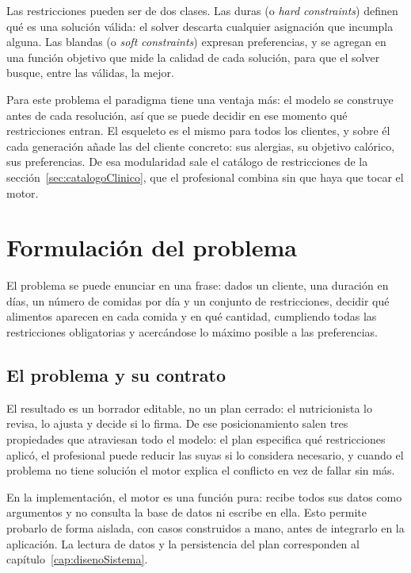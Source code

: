 Las restricciones pueden ser de dos clases. Las duras (o \textit{hard constraints}) definen qué es una solución válida: el solver descarta cualquier asignación que incumpla alguna. Las blandas (o \textit{soft constraints}) expresan preferencias, y se agregan en una función objetivo que mide la calidad de cada solución, para que el solver busque, entre las válidas, la mejor.

Para este problema el paradigma tiene una ventaja más: el modelo se construye antes de cada resolución, así que se puede decidir en ese momento qué restricciones entran. El esqueleto es el mismo para todos los clientes, y sobre él cada generación añade las del cliente concreto: sus alergias, su objetivo calórico, sus preferencias. De esa modularidad sale el catálogo de restricciones de la sección~\ref{sec:catalogoClinico}, que el profesional combina sin que haya que tocar el motor.

\section{Formulación del problema}
\label{sec:formulacionMotor}

El problema se puede enunciar en una frase: dados un cliente, una duración en días, un número de comidas por día y un conjunto de restricciones, decidir qué alimentos aparecen en cada comida y en qué cantidad, cumpliendo todas las restricciones obligatorias y acercándose lo máximo posible a las preferencias.

\subsection{El problema y su contrato}

El resultado es un borrador editable, no un plan cerrado: el nutricionista lo revisa, lo ajusta y decide si lo firma. De ese posicionamiento salen tres propiedades que atraviesan todo el modelo: el plan especifica qué restricciones aplicó, el profesional puede reducir las suyas si lo considera necesario, y cuando el problema no tiene solución el motor explica el conflicto en vez de fallar sin más.

En la implementación, el motor es una función pura: recibe todos sus datos como argumentos y no consulta la base de datos ni escribe en ella. Esto permite probarlo de forma aislada, con casos construidos a mano, antes de integrarlo en la aplicación. La lectura de datos y la persistencia del plan corresponden al capítulo~\ref{cap:disenoSistema}.

